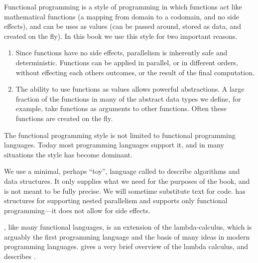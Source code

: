\begin{cluster}
\label{grp:grm:language:introduction::functional-algorithms}

\begin{gram}
\label{grm:language:introduction::functional-algorithms}
  Functional programming is a style of programming in which functions
  act like mathematical functions (a mapping from domain to a
  codomain, and no side effects), and can be uses as values (can be
  passed around, stored as data, and created on the fly).  In this
  book we use this style for two important reasons.

\begin{enumerate}
\item Since functions have no side effects, parallelism is inherently
  safe and deterministic. Functions can be applied in parallel, or in
  different orders, without effecting each others outcomes, or the
  result of the final computation.
\item The ability to use functions as values allows powerful
  abstractions.  A large fraction of the functions in many of the
  abstract data types we define, for example, take functions as
  arguments to other functions. Often these functions are created on
  the fly.
\end{enumerate}

The functional programming style is not limited to functional
programming languages.  Today most programming languages support it,
and in many situations the style has become dominant.  

\end{gram}
\end{cluster}

\begin{cluster}
\label{grp:grm:language:introduction::minimal}

\begin{gram}[\pml{}]
\label{grm:language:introduction::minimal}
We use a minimal, perhaps ``toy'',  language called \pml{} to describe algorithms
and data structures.   It only supplies what we need for the purposes of the book,
and is not meant to be fully precise.   We will sometime substitute text for code.  \pml{} has structures for supporting nested
parallelism and supports only functional programming---it does not allow for
side effects.

\pml{}, like many functional languages, is an extension of the
lambda-calculus, which is arguably the first programming language
and the basis of many ideas in modern programming languages.
 gives a very brief overview of the lambda
calculus, and  describes \pml{}.

\end{gram}
\end{cluster}

